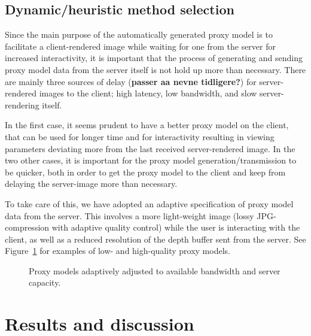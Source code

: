 \subsection{Dynamic/heuristic method selection}

Since the main purpose of the automatically generated proxy model is to
facilitate a client-rendered image while waiting for one from the server for
increased interactivity, it is important that the process of generating and
sending proxy model data from the server itself is not hold up more than
necessary. There are mainly three sources of delay (\textbf{passer aa nevne
tidligere?}) for server-rendered images to the client; high
latency, low bandwidth, and slow server-rendering itself.

In the first case, it seems prudent to have a better proxy model on the client,
that can be used for longer time and for interactivity resulting in viewing
parameters deviating more from the last received server-rendered image. In the
two other cases, it is important for the proxy model generation/transmission to
be quicker, both in order to get the proxy model to the client and keep from
delaying the server-image more than necessary.

To take care of this, we have adopted an adaptive specification of
proxy model data from the server. This involves a more light-weight image (lossy
JPG-compression with adaptive quality control) while the user is interacting
with the client, as well as a reduced resolution of the depth buffer sent from
the server. See Figure~\ref{fig:adapativeProxyModels} for examples of low- and
high-quality proxy models.

\begin{figure}[htb]
  \centering
  \subfigure[Low quality (tenker her jpg med q=0 og daarlig dybdebuffer, faa
  splats kanskje]{
    
  }
  \caption{\label{fig:adapativeProxyModels}
           Proxy models adaptively adjusted to available bandwidth and server
           capacity.}
\end{figure}



\section{Results and discussion}

